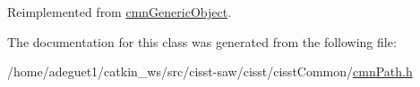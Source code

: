 Reimplemented from \hyperlink{classcmn_generic_object_ac2b71ce10573cceff0446748432f45df}{cmn\-Generic\-Object}.



The documentation for this class was generated from the following file\-:\begin{DoxyCompactItemize}
\item 
/home/adeguet1/catkin\-\_\-ws/src/cisst-\/saw/cisst/cisst\-Common/\hyperlink{cmn_path_8h}{cmn\-Path.\-h}\end{DoxyCompactItemize}
